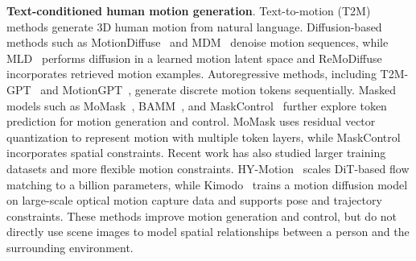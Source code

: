 \noindent \textbf{Text-conditioned human motion generation}. Text-to-motion (T2M) methods generate 3D human motion from natural language. Diffusion-based methods such as MotionDiffuse~\citep{zhang2024motiondiffuse} and MDM~\citep{tevet2023mdm} denoise motion sequences, while MLD~\citep{chen2023mld} performs diffusion in a learned motion latent space and ReMoDiffuse~\citep{zhang2023remodiffuse} incorporates retrieved motion examples. Autoregressive methods, including T2M-GPT~\citep{zhang2023t2mgpt} and MotionGPT~\citep{jiang2023motiongpt}, generate discrete motion tokens sequentially. Masked models such as MoMask~\citep{guo2024momask}, BAMM~\citep{pinyoanuntapong2024bamm}, and MaskControl~\citep{pinyoanuntapong2025maskcontrol} further explore token prediction for motion generation and control. MoMask uses residual vector quantization to represent motion with multiple token layers, while MaskControl incorporates spatial constraints. Recent work has also studied larger training datasets and more flexible motion constraints. HY-Motion~\citep{hymotion2025} scales DiT-based flow matching to a billion parameters, while Kimodo~\citep{Kimodo2026} trains a motion diffusion model on large-scale optical motion capture data and supports pose and trajectory constraints. These methods improve motion generation and control, but do not directly use scene images to model spatial relationships between a person and the surrounding environment.

